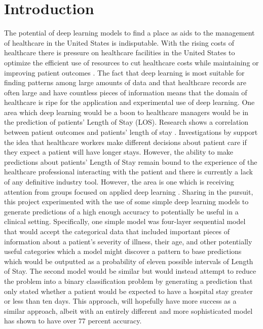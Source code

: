 \documentclass[sigconf,authorversion]{acmart}
\begin{document}
\section{Introduction}
The potential of deep learning models to find a place as aids to the management of healthcare in the United States is indisputable. With the rising costs of healthcare there is pressure on healthcare facilities in the United States to optimize the efficient use of resources to cut healthcare costs while maintaining or improving patient outcomes \cite{Hoyer}. The fact that deep learning is most suitable for finding patterns among large amounts of data and that healthcare records are often large and have countless pieces of information means that the domain of healthcare is ripe for the application and experimental use of deep learning. One area which deep learning would be a boon to healthcare managers would be in the prediction of patients' Length of Stay (LOS). Research shows a correlation between patient outcomes and patients' length of stay \cite{McDermott, Rojas} . Investigations by \cite{Grover} support the idea that healthcare workers make different decisions about patient care if they expect a patient will have longer stays. However, the ability to make predictions about patients' Length of Stay remain bound to the experience of the healthcare professional interacting with the patient \cite{Grover} and there is currently a lack of any definitive industry tool. However, the area is one which is receiving attention from groups focused on applied deep learning \cite{8791477}. Sharing in the pursuit, this project experimented with the use of some simple deep learning models to generate predictions of a high enough accuracy to potentially be useful in a clinical setting. Specifically, one simple model was four-layer sequential model that would accept the categorical data that included important pieces of information about a patient's severity of illness, their age, and other potentially useful categories which a model might discover a pattern to base predictions which would be outputted as a probability of eleven possible intervals of Length of Stay. The second model would be similar but would instead attempt to reduce the problem into a binary classification problem by generating a prediction that only stated whether a patient would be expected to have a hospital stay greater or less than ten days. This approach, will hopefully have more success as a similar approach, albeit with an entirely different and more sophisticated model has shown to have over 77 percent accuracy\cite{8791477}.
%
\end{document}
